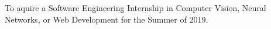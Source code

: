 

\begin{cvparagraph}

To aquire a Software Engineering Internship in Computer Vision, Neural Networks,
or Web Development for the Summer of 2019.
\end{cvparagraph}
